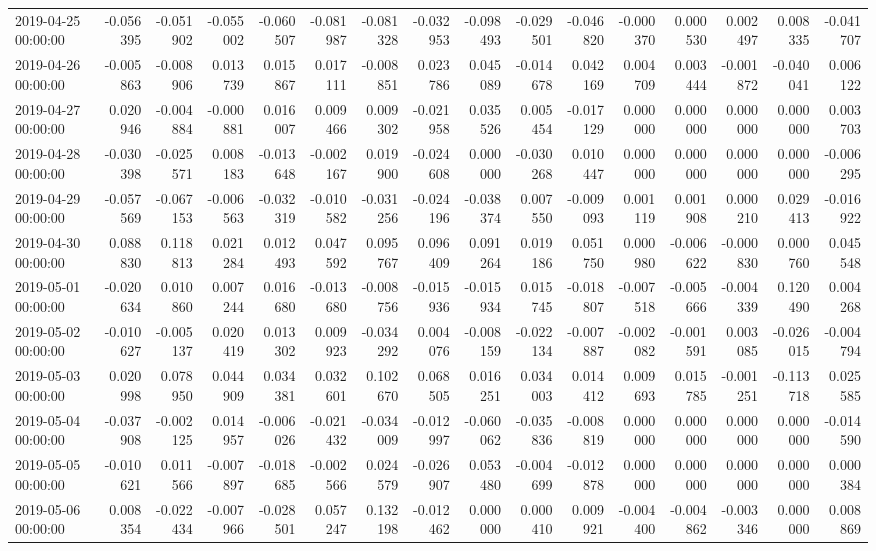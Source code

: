 \begin{tabular}{lrrrrrrrrrrrrrrr}
2019-04-25 00:00:00 & -0.056395 & -0.051902 & -0.055002 & -0.060507 & -0.081987 & -0.081328 & -0.032953 & -0.098493 & -0.029501 & -0.046820 & -0.000370 & 0.000530 & 0.002497 & 0.008335 & -0.041707 \\
2019-04-26 00:00:00 & -0.005863 & -0.008906 & 0.013739 & 0.015867 & 0.017111 & -0.008851 & 0.023786 & 0.045089 & -0.014678 & 0.042169 & 0.004709 & 0.003444 & -0.001872 & -0.040041 & 0.006122 \\
2019-04-27 00:00:00 & 0.020946 & -0.004884 & -0.000881 & 0.016007 & 0.009466 & 0.009302 & -0.021958 & 0.035526 & 0.005454 & -0.017129 & 0.000000 & 0.000000 & 0.000000 & 0.000000 & 0.003703 \\
2019-04-28 00:00:00 & -0.030398 & -0.025571 & 0.008183 & -0.013648 & -0.002167 & 0.019900 & -0.024608 & 0.000000 & -0.030268 & 0.010447 & 0.000000 & 0.000000 & 0.000000 & 0.000000 & -0.006295 \\
2019-04-29 00:00:00 & -0.057569 & -0.067153 & -0.006563 & -0.032319 & -0.010582 & -0.031256 & -0.024196 & -0.038374 & 0.007550 & -0.009093 & 0.001119 & 0.001908 & 0.000210 & 0.029413 & -0.016922 \\
2019-04-30 00:00:00 & 0.088830 & 0.118813 & 0.021284 & 0.012493 & 0.047592 & 0.095767 & 0.096409 & 0.091264 & 0.019186 & 0.051750 & 0.000980 & -0.006622 & -0.000830 & 0.000760 & 0.045548 \\
2019-05-01 00:00:00 & -0.020634 & 0.010860 & 0.007244 & 0.016680 & -0.013680 & -0.008756 & -0.015936 & -0.015934 & 0.015745 & -0.018807 & -0.007518 & -0.005666 & -0.004339 & 0.120490 & 0.004268 \\
2019-05-02 00:00:00 & -0.010627 & -0.005137 & 0.020419 & 0.013302 & 0.009923 & -0.034292 & 0.004076 & -0.008159 & -0.022134 & -0.007887 & -0.002082 & -0.001591 & 0.003085 & -0.026015 & -0.004794 \\
2019-05-03 00:00:00 & 0.020998 & 0.078950 & 0.044909 & 0.034381 & 0.032601 & 0.102670 & 0.068505 & 0.016251 & 0.034003 & 0.014412 & 0.009693 & 0.015785 & -0.001251 & -0.113718 & 0.025585 \\
2019-05-04 00:00:00 & -0.037908 & -0.002125 & 0.014957 & -0.006026 & -0.021432 & -0.034009 & -0.012997 & -0.060062 & -0.035836 & -0.008819 & 0.000000 & 0.000000 & 0.000000 & 0.000000 & -0.014590 \\
2019-05-05 00:00:00 & -0.010621 & 0.011566 & -0.007897 & -0.018685 & -0.002566 & 0.024579 & -0.026907 & 0.053480 & -0.004699 & -0.012878 & 0.000000 & 0.000000 & 0.000000 & 0.000000 & 0.000384 \\
2019-05-06 00:00:00 & 0.008354 & -0.022434 & -0.007966 & -0.028501 & 0.057247 & 0.132198 & -0.012462 & 0.000000 & 0.000410 & 0.009921 & -0.004400 & -0.004862 & -0.003346 & 0.000000 & 0.008869 \\

\end{tabular}
